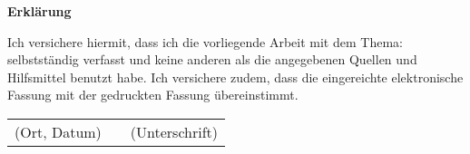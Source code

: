 \clearpage

\thispagestyle{empty}

{\LARGE\textsf{\textbf{Erklärung}}\bigskip}

Ich versichere hiermit, dass ich die vorliegende Arbeit mit dem Thema: \emph{\bootstrapPaperTitle} selbstständig verfasst und keine anderen als die angegebenen Quellen und Hilfsmittel
benutzt habe. Ich versichere zudem, dass die eingereichte elektronische Fassung
mit der gedruckten Fassung übereinstimmt.

\vspace{3cm}

\begin{center}
    \begin{tabular}{ccc}
        (Ort, Datum) & \hspace{0.3\linewidth} & (Unterschrift)
    \end{tabular}
\end{center}
